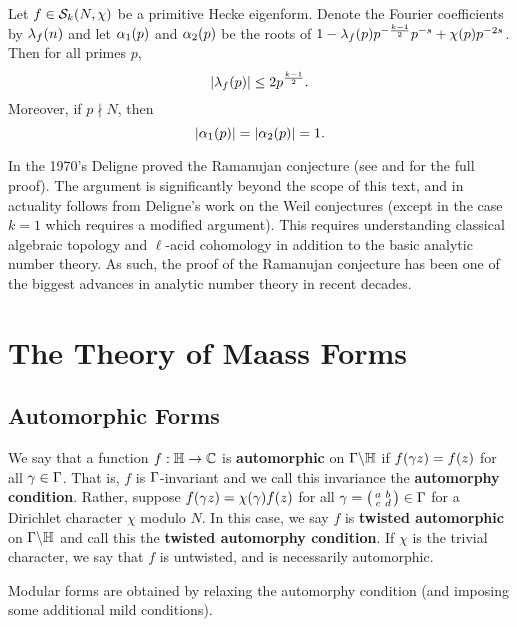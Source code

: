       \begin{theorem}
        Let $f \in \mathcal{S}_{k}(N,\chi)$ be a primitive Hecke eigenform. Denote the Fourier coefficients by $\lambda_{f}(n)$ and let $\alpha_{1}(p)$ and $\alpha_{2}(p)$ be the roots of $1-\lambda_{f}(p)p^{-\frac{k-1}{2}}p^{-s}+\chi(p)p^{-2s}$. Then for all primes $p$,
        \[
          |\lambda_{f}(p)| \le 2p^{\frac{k-1}{2}}.
        \]
        Moreover, if $p \nmid N$, then
        \[
          |\alpha_{1}(p)| = |\alpha_{2}(p)| = 1.
        \]
      \end{theorem}

      In the 1970's Deligne proved the Ramanujan conjecture (see \cite{deligne1971formes} and \cite{deligne1974conjecture} for the full proof). The argument is significantly beyond the scope of this text, and in actuality follows from Deligne's work on the Weil conjectures (except in the case $k = 1$ which requires a modified argument). This requires understanding classical algebraic topology and $\ell$-acid cohomology in addition to the basic analytic number theory. As such, the proof of the Ramanujan conjecture has been one of the biggest advances in analytic number theory in recent decades.
  \section{The Theory of Maass Forms}
    \subsection*{Automorphic Forms}
      We say that a function $f:\mathbb{H} \to \mathbb{C}$ is \textbf{automorphic} on $\Gamma\backslash\mathbb{H}$ if $f(\gamma z) = f(z)$ for all $\gamma \in \Gamma$. That is, $f$ is $\Gamma$-invariant and we call this invariance the \textbf{automorphy condition}. Rather, suppose $f(\gamma z) = \chi(\gamma)f(z)$ for all $\gamma = \begin{psmallmatrix} a & b \\ c & d \end{psmallmatrix} \in \Gamma$ for a Dirichlet character $\chi$ modulo $N$. In this case, we say $f$ is \textbf{twisted automorphic} on $\Gamma\backslash\mathbb{H}$ and call this the \textbf{twisted automorphy condition}. If $\chi$ is the trivial character, we say that $f$ is untwisted, and is necessarily automorphic.

      \begin{remark}
        Modular forms are obtained by relaxing the automorphy condition (and imposing some additional mild conditions).
      \end{remark}
      
